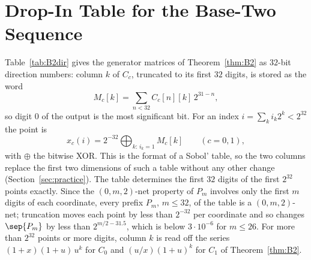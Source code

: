 \section{Drop-In Table for the Base-Two Sequence}\label{app:B2table}
Table~\ref{tab:B2dir} gives the generator matrices of Theorem~\ref{thm:B2} as $32$-bit direction numbers: column $k$ of $C_c$, truncated to its first $32$ digits, is stored as the word
\[
M_c[k]=\sum_{n<32}C_c[n][k]\,2^{31-n},
\]
so digit $0$ of the output is the most significant bit. For an index $i=\sum_ki_k2^k<2^{32}$ the point is
\[
x_c(i)=2^{-32}\bigoplus_{k:\,i_k=1}M_c[k]\qquad(c=0,1),
\]
with $\oplus$ the bitwise XOR. This is the format of a Sobol' table, so the two columns replace the first two dimensions of such a table without any other change (Section~\ref{sec:practice}). The table determines the first $32$ digits of the first $2^{32}$ points exactly. Since the $(0,m,2)$-net property of $P_m$ involves only the first $m$ digits of each coordinate, every prefix $P_m$, $m\le32$, of the table is a $(0,m,2)$-net; truncation moves each point by less than $2^{-32}$ per coordinate and so changes $\sep{P_m}$ by less than $2^{m/2-31.5}$, which is below $3\cdot10^{-6}$ for $m\le26$. For more than $2^{32}$ points or more digits, column $k$ is read off the series $(1+x)(1+u)\,u^k$ for $C_0$ and $(u/x)(1+u)^k$ for $C_1$ of Theorem~\ref{thm:B2}.

